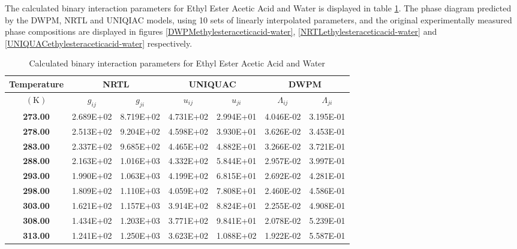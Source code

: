 The calculated binary interaction parameters for Ethyl Ester Acetic Acid and Water is displayed in table \ref{ethylesteraceticacid-waterTable}. The phase diagram predicted by the DWPM, NRTL and UNIQIAC models, using 10 sets of linearly interpolated parameters, and the original experimentally measured phase compositions are displayed in figures \ref{DWPMethylesteraceticacid-water}, \ref{NRTLethylesteraceticacid-water} and \ref{UNIQUACethylesteraceticacid-water} respectively.\\

\begin{table}
\begin{tabularx}{\textwidth}{c|cc|cc|cc}
\hline
\textbf{Temperature}&\multicolumn{2}{c|}{\textbf{NRTL}}&\multicolumn{2}{c|}{\textbf{UNIQUAC}}&\multicolumn{2}{c}{\textbf{DWPM}}\\
\hline
\hline 
$\left(\mathrm{K}\right)$&$g_{ij}$&$g_{ji}$&$u_{ij}$&$u_{ji}$&$\Lambda_{ij}$&$\Lambda_{ji}$\\
\hline
\textbf{ 273.00 } & 2.689E+02 & 8.719E+02 & 4.731E+02 & 2.994E+01 & 4.046E-02 & 3.195E-01\\
\textbf{ 278.00 } & 2.513E+02 & 9.204E+02 & 4.598E+02 & 3.930E+01 & 3.626E-02 & 3.453E-01\\
\textbf{ 283.00 } & 2.337E+02 & 9.685E+02 & 4.465E+02 & 4.882E+01 & 3.266E-02 & 3.721E-01\\
\textbf{ 288.00 } & 2.163E+02 & 1.016E+03 & 4.332E+02 & 5.844E+01 & 2.957E-02 & 3.997E-01\\
\textbf{ 293.00 } & 1.990E+02 & 1.063E+03 & 4.199E+02 & 6.815E+01 & 2.692E-02 & 4.281E-01\\
\textbf{ 298.00 } & 1.809E+02 & 1.110E+03 & 4.059E+02 & 7.808E+01 & 2.460E-02 & 4.586E-01\\
\textbf{ 303.00 } & 1.621E+02 & 1.157E+03 & 3.914E+02 & 8.824E+01 & 2.255E-02 & 4.908E-01\\
\textbf{ 308.00 } & 1.434E+02 & 1.203E+03 & 3.771E+02 & 9.841E+01 & 2.078E-02 & 5.239E-01\\
\textbf{ 313.00 } & 1.241E+02 & 1.250E+03 & 3.623E+02 & 1.088E+02 & 1.922E-02 & 5.587E-01\\
\hline
\end{tabularx}\\
\caption{Calculated binary interaction parameters for Ethyl Ester Acetic Acid and Water} \label{ethylesteraceticacid-waterTable}
\end{table}


